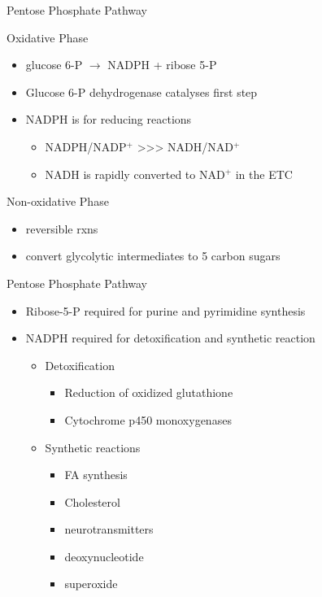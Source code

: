 \documentclass[presentation, smaller]{beamer}
\begin{document}
\begin{frame}[label={sec:orgd2e28da}]{Pentose Phosphate Pathway}
\begin{block}{Oxidative Phase}
\begin{itemize}
\item glucose 6-P \(\to\) NADPH + ribose 5-P
\item Glucose 6-P dehydrogenase catalyses first step
\item NADPH is for reducing reactions
\begin{itemize}
\item NADPH/NADP\(^{\text{+}}\) \textgreater{}\textgreater{}\textgreater{} NADH/NAD\(^{\text{+}}\)
\item NADH is rapidly converted to NAD\(^{\text{+}}\) in the ETC
\end{itemize}
\end{itemize}
\end{block}
\begin{block}{Non-oxidative Phase}
\begin{itemize}
\item reversible rxns
\item convert glycolytic intermediates to 5 carbon sugars
\end{itemize}
\end{block}
\end{frame}
\begin{frame}[label={sec:orgff4675e}]{Pentose Phosphate Pathway}
\begin{itemize}
\item Ribose-5-P required for purine and pyrimidine synthesis
\item NADPH required for detoxification and synthetic reaction
\begin{itemize}
\item Detoxification
\begin{itemize}
\item Reduction of oxidized glutathione
\item Cytochrome p450 monoxygenases
\end{itemize}
\item Synthetic reactions
\begin{itemize}
\item FA synthesis
\item Cholesterol
\item neurotransmitters
\item deoxynucleotide
\item superoxide
\end{itemize}
\end{itemize}
\end{itemize}
\end{frame}
\end{document}
